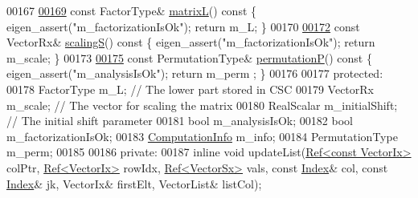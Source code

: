 \begin{DoxyCode}
00167 
\hyperlink{class_eigen_1_1_incomplete_cholesky_a7d1f1878505fd1862e6f2286d27ff09a}{00169}     \textcolor{keyword}{const} FactorType& \hyperlink{class_eigen_1_1_incomplete_cholesky_a7d1f1878505fd1862e6f2286d27ff09a}{matrixL}()\textcolor{keyword}{ const }\{ eigen\_assert(\textcolor{stringliteral}{"m\_factorizationIsOk"}); \textcolor{keywordflow}{return} m\_L; \}
00170 
\hyperlink{class_eigen_1_1_incomplete_cholesky_a30d66dd77147a84ec3302e7d5fe5d924}{00172}     \textcolor{keyword}{const} VectorRx& \hyperlink{class_eigen_1_1_incomplete_cholesky_a30d66dd77147a84ec3302e7d5fe5d924}{scalingS}()\textcolor{keyword}{ const }\{ eigen\_assert(\textcolor{stringliteral}{"m\_factorizationIsOk"}); \textcolor{keywordflow}{return} m\_scale; \}
00173 
\hyperlink{class_eigen_1_1_incomplete_cholesky_a0d52cec5e17f485a362766363ba90b02}{00175}     \textcolor{keyword}{const} PermutationType& \hyperlink{class_eigen_1_1_incomplete_cholesky_a0d52cec5e17f485a362766363ba90b02}{permutationP}()\textcolor{keyword}{ const }\{ eigen\_assert(\textcolor{stringliteral}{"m\_analysisIsOk"}); \textcolor{keywordflow}{return} m\_perm
      ; \}
00176 
00177   \textcolor{keyword}{protected}:
00178     FactorType m\_L;              \textcolor{comment}{// The lower part stored in CSC}
00179     VectorRx m\_scale;            \textcolor{comment}{// The vector for scaling the matrix }
00180     RealScalar m\_initialShift;   \textcolor{comment}{// The initial shift parameter}
00181     \textcolor{keywordtype}{bool} m\_analysisIsOk; 
00182     \textcolor{keywordtype}{bool} m\_factorizationIsOk; 
00183     \hyperlink{group__enums_ga85fad7b87587764e5cf6b513a9e0ee5e}{ComputationInfo} m\_info;
00184     PermutationType m\_perm; 
00185 
00186   \textcolor{keyword}{private}:
00187     \textcolor{keyword}{inline} \textcolor{keywordtype}{void} updateList(\hyperlink{group___core___module_class_eigen_1_1_ref}{Ref<const VectorIx>} colPtr, 
      \hyperlink{group___core___module_class_eigen_1_1_ref}{Ref<VectorIx>} rowIdx, \hyperlink{group___core___module_class_eigen_1_1_ref}{Ref<VectorSx>} vals, \textcolor{keyword}{const} \hyperlink{namespace_eigen_a62e77e0933482dafde8fe197d9a2cfde}{Index}& col, \textcolor{keyword}{const} 
      \hyperlink{namespace_eigen_a62e77e0933482dafde8fe197d9a2cfde}{Index}& jk, VectorIx& firstElt, VectorList& listCol); 

\end{DoxyCode}
